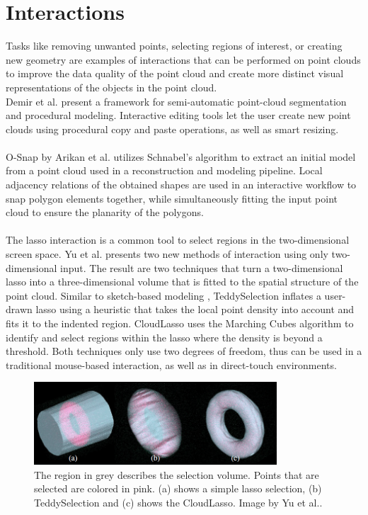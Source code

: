 \section {Interactions}
\label{sec:related_work_interactions}
Tasks like removing unwanted points, selecting regions of interest, or creating new geometry are examples of interactions that can be performed on point clouds to improve the data quality of the point cloud and create more distinct visual representations of the objects in the point cloud.  
\\
Demir et al. \cite{demir2015procedural} present a framework for semi-automatic point-cloud segmentation and procedural modeling. Interactive editing tools let the user create new point clouds using procedural copy and paste operations, as well as smart resizing. 
\\
\\
O-Snap by Arikan et al. \cite{arikan-2013-osn} utilizes Schnabel's algorithm to extract an initial model from a point cloud used in a reconstruction and modeling pipeline. Local adjacency relations of the obtained shapes are used in an interactive workflow to snap polygon elements together, while simultaneously fitting the input point cloud to ensure the planarity of the polygons. 
\\
\\
The lasso interaction is a common tool to select regions in the two-dimensional screen space. Yu et al. \cite{yu2012efficient} presents two new methods of interaction using only two-dimensional input. The result are two techniques that turn a two-dimensional lasso into a three-dimensional volume that is fitted to the spatial structure of the point cloud. Similar to sketch-based modeling \cite{igarashi2007teddy}, TeddySelection inflates a user-drawn lasso using a heuristic that takes the local point density into account and fits it to the indented region. CloudLasso uses the Marching Cubes algorithm \cite{lorensen1987marching} to identify and select regions within the lasso where the density is beyond a threshold. Both techniques only use two degrees of freedom, thus can be used in a traditional mouse-based interaction, as well as in direct-touch environments. 

\begin{figure}[ht]
    \centering
    \includegraphics[width=0.81\textwidth]{Related_Work/teddyCloudSelection.png}%
    \caption[Comparison of (a) simple lasso selection, (b) TeddySelection and (c) CloudLasso]
		{The region in grey describes the selection volume. Points that are selected are colored in pink. (a) shows a simple lasso selection, (b) TeddySelection and (c) shows the CloudLasso. Image by Yu et al.\cite{yu2012efficient}.}
    \label{fig:teddyCloudSelection}
\end{figure}

